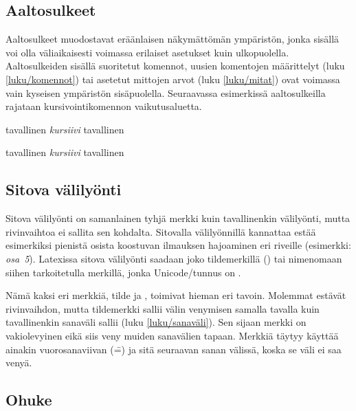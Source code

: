 \subsection{Aaltosulkeet}
\label{luku/aaltosulkeet}

Aaltosulkeet \mbox{\koodi{\{\}}} muodostavat eräänlaisen näkymättömän
ympäristön, jonka sisällä voi olla väliaikaisesti voimassa erilaiset
asetukset kuin ulkopuolella. Aaltosulkeiden sisällä suoritetut komennot,
uusien komentojen määrittelyt (luku \ref{luku/komennot}) tai asetetut
mittojen arvot (luku \ref{luku/mitat}) ovat voimassa vain kyseisen
ympäristön sisäpuolella. Seuraavassa esimerkissä aaltosulkeilla rajataan
kursivointikomennon  vaikutusaluetta.

\begin{koodilohkosis}
tavallinen {\itshape kursiivi} tavallinen
\end{koodilohkosis}

\begin{tulossis}
  tavallinen {\itshape kursiivi} tavallinen
\end{tulossis}

\subsection{Sitova välilyönti}

Sitova välilyönti on samanlainen tyhjä merkki kuin tavallinenkin
välilyönti, mutta rivinvaihtoa ei sallita sen kohdalta. Sitovalla
välilyönnillä kannattaa estää esimerkiksi pienistä osista koostuvan
ilmauksen hajoaminen eri riveille (esimerkki: \emph{osa~5}). Latexissa
sitova välilyönti saadaan joko tildemerkillä (\koodi{\textasciitilde})
tai nimenomaan siihen tarkoitetulla merkillä, jonka Unicode\-/tunnus on
.

Nämä kaksi eri merkkiä, tilde ja , toimivat hieman eri
tavoin. Molemmat estävät rivinvaihdon, mutta tildemerkki sallii välin
venymisen samalla tavalla kuin tavallinenkin sanaväli sallii (luku
\ref{luku/sanaväli}). Sen sijaan merkki  on
vakiolevyinen eikä siis veny muiden sanavälien tapaan. Merkkiä
 täytyy käyttää ainakin vuorosanaviivan (\==) ja sitä
seuraavan sanan välissä, koska se väli ei saa venyä.

\subsection{Ohuke}
\label{luku/ohuke}

